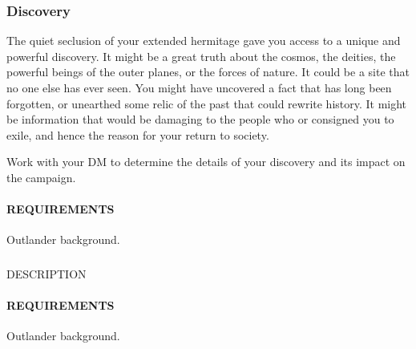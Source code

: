    \subsubsection{Discovery} \label{feat::discovery} %
    The quiet seclusion of your extended hermitage gave you access to a unique and powerful discovery.
    It might be a great truth about the cosmos, the deities, the powerful beings of the outer planes, or the forces of nature.
    It could be a site that no one else has ever seen.
    You might have uncovered a fact that has long been forgotten, or unearthed some relic of the past that could rewrite history.
    It might be information that would be damaging to the people who or consigned you to exile, and hence the reason for your return to society.

    Work with your DM to determine the details of your discovery and its impact on the campaign.
    \paragraph{REQUIREMENTS} Outlander background.

    \subsubsection{} \label{feat::NAME}
    DESCRIPTION
    \paragraph{REQUIREMENTS} Outlander background.



